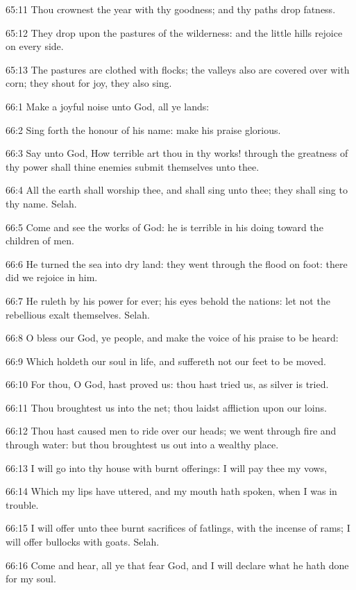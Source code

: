 65:11 Thou crownest the year with thy goodness; and thy paths drop
fatness.

65:12 They drop upon the pastures of the wilderness: and the little
hills rejoice on every side.

65:13 The pastures are clothed with flocks; the valleys also are
covered over with corn; they shout for joy, they also sing.



66:1 Make a joyful noise unto God, all ye lands:

66:2 Sing forth the honour of his name: make his praise glorious.

66:3 Say unto God, How terrible art thou in thy works! through the
greatness of thy power shall thine enemies submit themselves unto
thee.

66:4 All the earth shall worship thee, and shall sing unto thee; they
shall sing to thy name. Selah.

66:5 Come and see the works of God: he is terrible in his doing toward
the children of men.

66:6 He turned the sea into dry land: they went through the flood on
foot: there did we rejoice in him.

66:7 He ruleth by his power for ever; his eyes behold the nations: let
not the rebellious exalt themselves. Selah.

66:8 O bless our God, ye people, and make the voice of his praise to
be heard:

66:9 Which holdeth our soul in life, and suffereth not our feet to be
moved.

66:10 For thou, O God, hast proved us: thou hast tried us, as silver
is tried.

66:11 Thou broughtest us into the net; thou laidst affliction upon our
loins.

66:12 Thou hast caused men to ride over our heads; we went through
fire and through water: but thou broughtest us out into a wealthy
place.

66:13 I will go into thy house with burnt offerings: I will pay thee
my vows,

66:14 Which my lips have uttered, and my mouth hath spoken, when I was
in trouble.

66:15 I will offer unto thee burnt sacrifices of fatlings, with the
incense of rams; I will offer bullocks with goats. Selah.

66:16 Come and hear, all ye that fear God, and I will declare what he
hath done for my soul.

